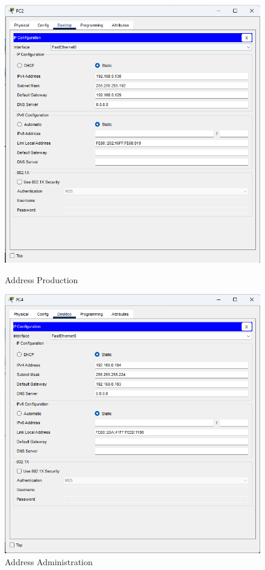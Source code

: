 \begin{figure}[H]
  \centering
  \begin{minipage}[t]{0.48\textwidth}
    \centering
    \includegraphics[width=\linewidth]{P1/img/IPprod.png}
    \caption{Address Production}
    \label{fig:production}
  \end{minipage}
  \hfill
  \begin{minipage}[t]{0.48\textwidth}
    \centering
    \includegraphics[width=\linewidth]{P1/img/IPadm.png}
    \caption{Address Administration}
    \label{fig:admin}
  \end{minipage}
\end{figure}

